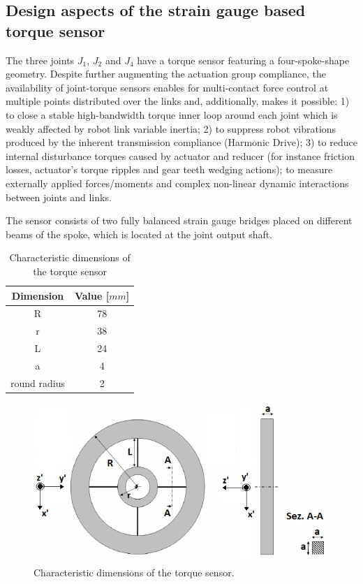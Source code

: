 \documentclass[journal]{IEEEtran}
\newcommand{\hldone}[1]{\colorbox{green}{#1}}
\begin{document}
\subsection{Design aspects of the strain gauge based torque sensor}
\label{subsec:DesignTorqueSensor}
The three joints $J_1$, $J_2$ and $J_4$ have a torque sensor featuring a four-spoke-shape geometry. 
Despite further augmenting the actuation group compliance, the availability of joint-torque sensors enables for multi-contact force control at multiple points distributed over the links and, additionally, makes it possible: 1) to close a stable high-bandwidth torque inner loop around each joint which is weakly affected by robot link variable inertia; 2) to suppress robot vibrations produced by the inherent transmission compliance (Harmonic Drive); 3) to reduce internal disturbance torques caused by actuator and reducer (for instance friction losses, actuator's torque ripples and gear teeth wedging actions); to measure externally applied forces/moments and complex non-linear dynamic interactions between joints and links.
\par The sensor consists of two fully balanced strain gauge bridges placed on different beams of the spoke, which is located at the joint output shaft. 
%
%
\begin{table}[t]
	\renewcommand{\arraystretch}{1.3}
	\caption{Characteristic dimensions of the torque sensor}
	\label{tab:sensorDimension}
	\centering
	\begin{tabular}{c c}
		\hline \hline
		\bfseries Dimension & \bfseries Value [$mm$] \\
		\hline
		R & 78 \\
		r & 38 \\
		L & 24 \\
		a & 4 \\
		round radius & 2 \\
		\hline \hline
	\end{tabular}
\end{table} 
%
\begin{figure}[]
	\centering
	\includegraphics[width=0.7\columnwidth]{sensorDimensions}
	\caption{Characteristic dimensions of the torque sensor.}
	\label{fig:sensorDimensions}
\end{figure}
\end{document}
